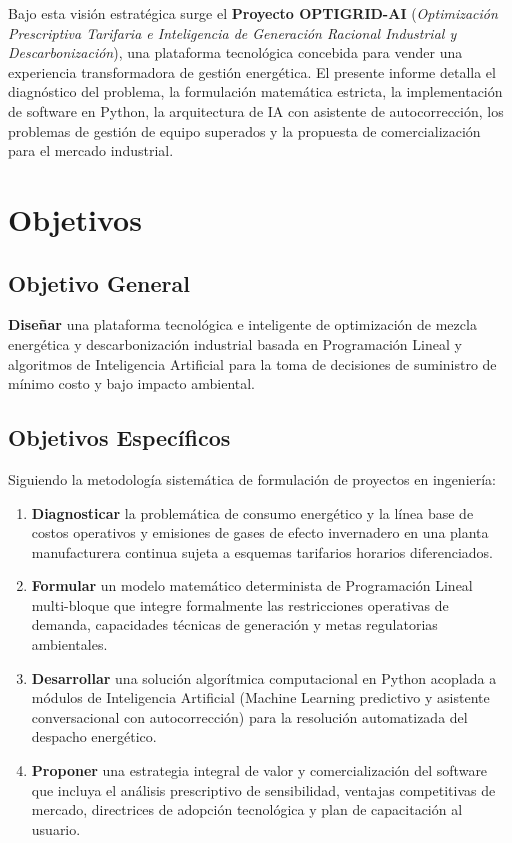 \documentclass[11pt,a4paper]{article}
\begin{document}
Bajo esta visión estratégica surge el \textbf{Proyecto OPTIGRID-AI} (\textit{Optimización Prescriptiva Tarifaria e Inteligencia de Generación Racional Industrial y Descarbonización}), una plataforma tecnológica concebida para vender una experiencia transformadora de gestión energética. El presente informe detalla el diagnóstico del problema, la formulación matemática estricta, la implementación de software en Python, la arquitectura de IA con asistente de autocorrección, los problemas de gestión de equipo superados y la propuesta de comercialización para el mercado industrial.

\section{Objetivos}

\subsection{Objetivo General}
\textbf{Diseñar} una plataforma tecnológica e inteligente de optimización de mezcla energética y descarbonización industrial basada en Programación Lineal y algoritmos de Inteligencia Artificial para la toma de decisiones de suministro de mínimo costo y bajo impacto ambiental.

\subsection{Objetivos Específicos}
Siguiendo la metodología sistemática de formulación de proyectos en ingeniería:
\begin{enumerate}
    \item \textbf{Diagnosticar} la problemática de consumo energético y la línea base de costos operativos y emisiones de gases de efecto invernadero en una planta manufacturera continua sujeta a esquemas tarifarios horarios diferenciados.
    \item \textbf{Formular} un modelo matemático determinista de Programación Lineal multi-bloque que integre formalmente las restricciones operativas de demanda, capacidades técnicas de generación y metas regulatorias ambientales.
    \item \textbf{Desarrollar} una solución algorítmica computacional en Python acoplada a módulos de Inteligencia Artificial (Machine Learning predictivo y asistente conversacional con autocorrección) para la resolución automatizada del despacho energético.
    \item \textbf{Proponer} una estrategia integral de valor y comercialización del software que incluya el análisis prescriptivo de sensibilidad, ventajas competitivas de mercado, directrices de adopción tecnológica y plan de capacitación al usuario.
\end{enumerate}
\end{document}
